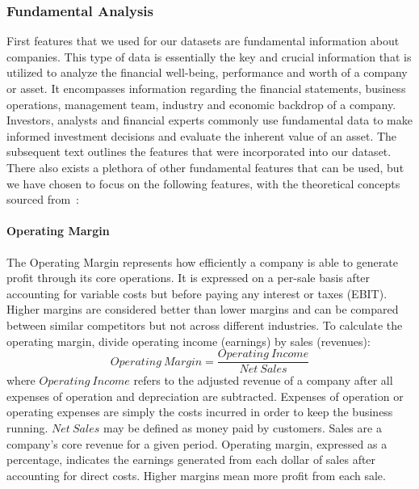 \documentclass[../xlapes02]{subfiles}
\begin{document}
    \subsubsection{Fundamental Analysis}\label{subsubsec:fundamental-analysis}
    First features that we used for our datasets are fundamental information about companies. This type of data is essentially the key and crucial information that is utilized to analyze the financial well-being, performance and worth of a company or asset. It encompasses information regarding the financial statements, business operations, management team, industry and economic backdrop of a company. Investors, analysts and financial experts commonly use fundamental data to make informed investment decisions and evaluate the inherent value of an asset. The subsequent text outlines the features that were incorporated into our dataset. There also exists a plethora of other fundamental features that can be used, but we have chosen to focus on the following features, with the theoretical concepts sourced from~\cite{investopedia}:

    \paragraph{Operating Margin}\label{par:operating-margin}
    The Operating Margin represents how efficiently a company is able to generate profit through its core operations. It is expressed on a per-sale basis after accounting for variable costs but before paying any interest or taxes (EBIT). Higher margins are considered better than lower margins and can be compared between similar competitors but not across different industries. To calculate the operating margin, divide operating income (earnings) by sales (revenues):
    \begin{equation}
        \label{eq:operating-margin}
        Operating\ Margin=\frac{Operating\ Income}{Net\ Sales}
    \end{equation}
    where $Operating\ Income$ refers to the adjusted revenue of a company after all expenses of operation and depreciation are subtracted. Expenses of operation or operating expenses are simply the costs incurred in order to keep the business running. $Net\ Sales$ may be defined as money paid by customers. Sales are a company's core revenue for a given period. Operating margin, expressed as a percentage, indicates the earnings generated from each dollar of sales after accounting for direct costs. Higher margins mean more profit from each sale.
\end{document}
